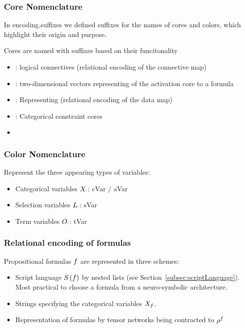 \subsubsection{Core Nomenclature}

In encoding.suffixes we defined suffixes for the names of cores and colors, which highlight their origin and purpose.

Cores are named with suffixes based on their funcitonality
\begin{itemize}
	\item {}: logical connectives (relational encoding of the connective map)
	\item {}: two-dimensional vectors representing of the activation core to a formula 
	\item {}: Representing (relational encoding of the data map)
	\item {}: Categorical constraint cores 
	\item {}
\end{itemize}

\subsubsection{Color Nomenclature}

Represent the three appearing types of variables:
\begin{itemize}
	\item Categorical variables $X_{\cdot}$: cVar / aVar
	\item Selection variables $L_{\cdot}$: sVar %
	\item Term variables $O_{\cdot}$: tVar %
\end{itemize}


\subsubsection{Relational encoding of formulas}

Propositional formulas $f$ are represented in three schemes:
\begin{itemize}
	\item Script language $S\left(f\right)$ by nested lists (see Section~\ref{subsec:scriptLanguage}).
		Most practical to choose a formula from a neuro-symbolic architecture.
	\item Strings specifying the categorical variables $X_{f}$.
	\item Representation of formulas by tensor networks being contracted to $\rho^{f}$
\end{itemize}


